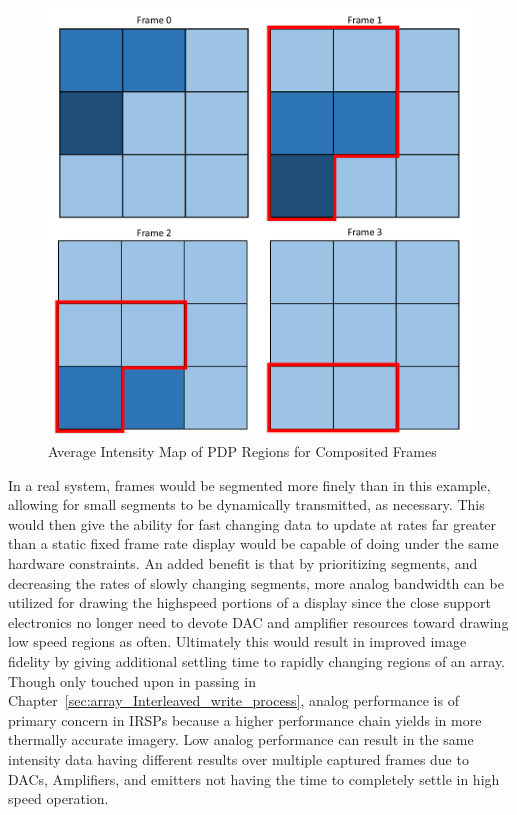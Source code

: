     \begin{figure}
        \centering
        \includegraphics[width=1.0\textwidth]{fig/frames.pdf}
        \caption{Average Intensity Map of PDP Regions for Composited Frames}
        \label{fig:intensity_map}
    \end{figure}

    In a real system, frames would be segmented more finely than in this example, allowing for small segments to be dynamically transmitted, as necessary. This would then give the ability for fast changing data to update at rates far greater than a static fixed frame rate display would be capable of doing under the same hardware constraints. An added benefit is that by prioritizing segments, and decreasing the rates of slowly changing segments, more analog bandwidth can be utilized for drawing the highspeed portions of a display since the close support electronics no longer need to devote DAC and amplifier resources toward drawing low speed regions as often. Ultimately this would result in improved image fidelity by giving additional settling time to rapidly changing regions of an array. Though only touched upon in passing in Chapter~\ref{sec:array_Interleaved_write_process}, analog performance is of primary concern in IRSPs because a higher performance chain yields in more thermally accurate imagery. Low analog performance can result in the same intensity data having different results over multiple captured frames due to DACs, Amplifiers, and emitters not having the time to completely settle in high speed operation.
